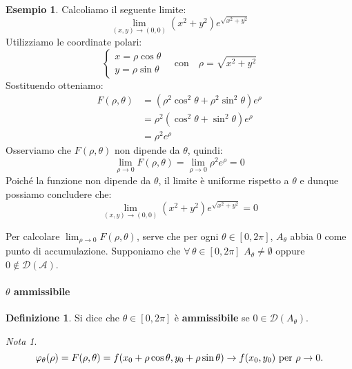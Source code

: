 \documentclass{article}
\theoremstyle{plain}
\theoremstyle{definition}
\newtheorem{defn}{Definizione}[section]
\newtheorem{exmp}{Esempio}[section]
\theoremstyle{remark}
\newtheorem{note}{Nota}
\begin{document}
\begin{exmp}
Calcoliamo il seguente limite:
\[
\lim_{(x,y)\to(0,0)}(x^2+y^2)e^{\sqrt{x^2+y^2}}
\]
Utilizziamo le coordinate polari:
\[
\begin{cases}
    x = \rho\cos\theta \\
    y = \rho\sin\theta
\end{cases}
\quad\text{con}\quad \rho = \sqrt{x^2+y^2}
\]
Sostituendo otteniamo:
\[
\begin{aligned}
    F(\rho,\theta) &= (\rho^2\cos^2\theta + \rho^2\sin^2\theta)e^{\rho} \\
    &= \rho^2(\cos^2\theta + \sin^2\theta)e^{\rho} \\
    &= \rho^2e^{\rho}
\end{aligned}
\]
Osserviamo che $F(\rho,\theta)$ non dipende da $\theta$, quindi:
\[
\lim_{\rho\to0}F(\rho,\theta) = \lim_{\rho\to0}\rho^2e^{\rho} = 0
\]
Poiché la funzione non dipende da $\theta$, il limite è uniforme rispetto a $\theta$ e dunque possiamo concludere che:
\[
\lim_{(x,y)\to(0,0)}(x^2+y^2)e^{\sqrt{x^2+y^2}} = 0
\]
\end{exmp}

\vspace{10pt}

Per calcolare $\lim_{\rho\to0}F(\rho,\theta)$, serve che per ogni $\theta\in[0,2\pi]$, $A_\theta$ abbia $0$ come punto di accumulazione.
Supponiamo che $\forall\,\theta\in[0,2\pi]$ $A_\theta\neq\emptyset$ oppure $0\notin\mathcal{D(A)}$.

\vspace{10pt}

\paragraph{$\theta$ ammissibile}
\begin{bxthm}
\begin{defn}
    Si dice che $\theta\in[0,2\pi]$ è \textbf{ammissibile} se $0\in\mathcal{D}(A_\theta)$.
\end{defn}
\end{bxthm}

\vspace{10pt}

\begin{note}
    \[\varphi_\theta(\rho)=F(\rho,\theta)=f(x_0+\rho\cos\theta,y_0+\rho\sin\theta)\to f(x_0,y_0)\textup{ per }\rho\to0.\]
\end{note}

\vspace{10pt}
\end{document}

